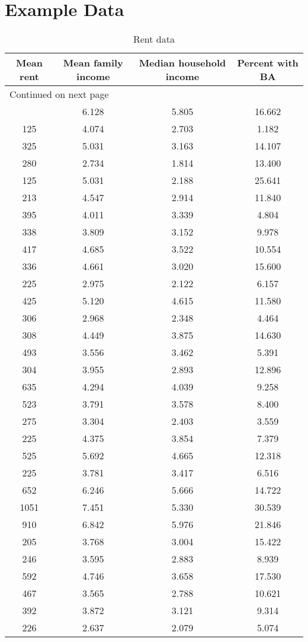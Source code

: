 \chapter{Example Data}

\begin{longtable}{cccc}
\caption{Rent data \label{tab:rentdata}} \\
Mean rent & Mean family income & Median household income & Percent with BA \\
\hline
\endhead
\hline \multicolumn{4}{l}{{Continued on next page}} \\ \hline
\endfoot
\endlastfoot
625&6.128&5.805&16.662 \\
125&4.074&2.703&1.182 \\
325&5.031&3.163&14.107 \\
280&2.734&1.814&13.400 \\
125&5.031&2.188&25.641 \\
213&4.547&2.914&11.840 \\
395&4.011&3.339&4.804 \\
338&3.809&3.152&9.978 \\
417&4.685&3.522&10.554 \\
336&4.661&3.020&15.600 \\
225&2.975&2.122&6.157 \\
425&5.120&4.615&11.580 \\
306&2.968&2.348&4.464 \\
308&4.449&3.875&14.630 \\
493&3.556&3.462&5.391 \\
304&3.955&2.893&12.896 \\
635&4.294&4.039&9.258 \\
523&3.791&3.578&8.400 \\
275&3.304&2.403&3.559 \\
225&4.375&3.854&7.379 \\
525&5.692&4.665&12.318 \\
225&3.781&3.417&6.516 \\
652&6.246&5.666&14.722 \\
1051&7.451&5.330&30.539 \\
910&6.842&5.976&21.846 \\
205&3.768&3.004&15.422 \\
246&3.595&2.883&8.939 \\
592&4.746&3.658&17.530 \\
467&3.565&2.788&10.621 \\
392&3.872&3.121&9.314 \\
226&2.637&2.079&5.074 \\

\end{longtable}
